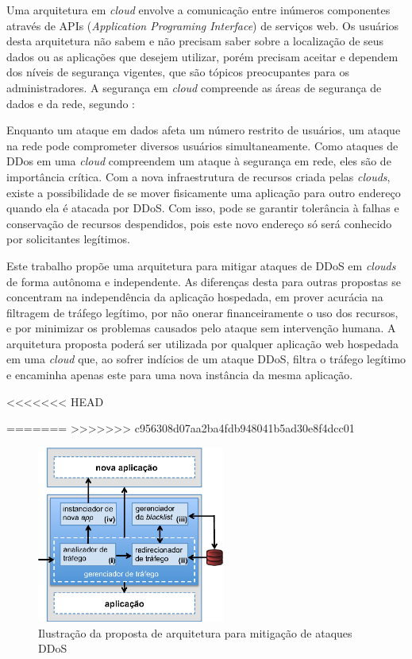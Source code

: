 

Uma arquitetura em \emph{cloud} envolve a comunicação entre inúmeros componentes através de APIs (\emph{Application Programing Interface}) de serviços web. Os usuários desta arquitetura não sabem e não precisam saber sobre a localização de seus dados ou as aplicações que desejem utilizar, porém precisam aceitar e dependem  dos níveis de segurança vigentes, que são tópicos preocupantes para os administradores.
A segurança em \emph{cloud} compreende as áreas de segurança de dados e da rede, segundo \cite{Dhage:2011:IDS:1980022.1980076}:  

Enquanto um ataque em dados afeta um número restrito de usuários, um ataque na rede pode comprometer diversos usuários simultaneamente. Como ataques de DDos em uma \emph{cloud} compreendem um ataque à segurança em rede, eles são de importância crítica.  
%
Com a nova infraestrutura de recursos criada pelas \emph{clouds}, existe a possibilidade de se mover fisicamente uma aplicação para outro endereço quando ela é atacada por DDoS. Com isso, pode se garantir tolerância à falhas e conservação de recursos despendidos, pois este novo endereço só será conhecido por solicitantes legítimos.

Este trabalho propõe uma arquitetura para mitigar ataques de DDoS em \emph{clouds} de forma autônoma e independente. As diferenças desta para outras propostas se concentram na independência da aplicação hospedada, em prover acurácia na filtragem de tráfego legítimo, por não onerar financeiramente o uso dos recursos, e por minimizar os problemas causados pelo ataque sem intervenção humana.
%
A arquitetura proposta poderá ser utilizada por qualquer aplicação web hospedada em uma \emph{cloud} que, ao sofrer indícios de um ataque DDoS, filtra o tráfego legítimo e encaminha apenas este para uma nova instância da mesma aplicação. 

<<<<<<< HEAD

=======
%
>>>>>>> c956308d07aa2ba4fdb948041b5ad30e8f4dcc01
\begin{figure}[h!]
\centering
\includegraphics[width=0.55\textwidth]{images/arq.eps}
\caption{Ilustração da proposta de arquitetura para mitigação de ataques DDoS}
\label{fig:arq}
\end{figure}

